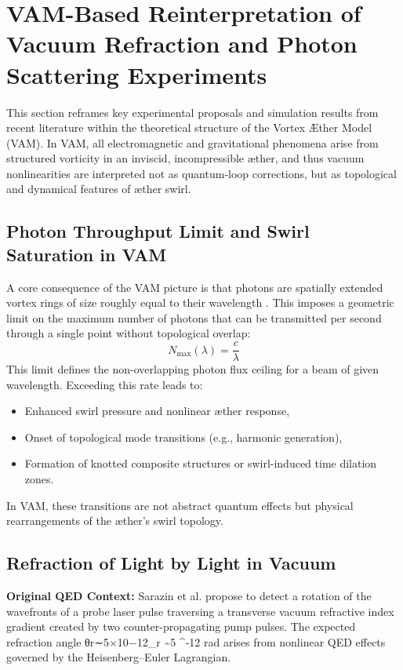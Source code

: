 
\section{VAM-Based Reinterpretation of Vacuum Refraction and Photon Scattering Experiments}


This section reframes key experimental proposals and simulation results from recent literature within the theoretical structure of the Vortex \AE{}ther Model (VAM). In VAM, all electromagnetic and gravitational phenomena arise from structured vorticity in an inviscid, incompressible \ae{}ther, and thus vacuum nonlinearities are interpreted not as quantum-loop corrections, but as topological and dynamical features of \ae{}ther swirl.


\subsection{Photon Throughput Limit and Swirl Saturation in VAM}

A core consequence of the VAM picture is that photons are spatially extended vortex rings of size roughly equal to their wavelength . This imposes a geometric limit on the maximum number of photons that can be transmitted per second through a single point without topological overlap:
\begin{equation}
N_\text{max}(\lambda) = \frac{c}{\lambda}
\end{equation}
This limit defines the non-overlapping photon flux ceiling for a beam of given wavelength. Exceeding this rate leads to:
\begin{itemize}
\item Enhanced swirl pressure and nonlinear \ae{}ther response,
\item Onset of topological mode transitions (e.g., harmonic generation),
\item Formation of knotted composite structures or swirl-induced time dilation zones.
\end{itemize}
In VAM, these transitions are not abstract quantum effects but physical rearrangements of the \ae{}ther's swirl topology.




\subsection{Refraction of Light by Light in Vacuum\cite{sarazin2016refraction}}


\textbf{Original QED Context:} Sarazin et al. propose to detect a rotation of the wavefronts of a probe laser pulse traversing a transverse vacuum refractive index gradient created by two counter-propagating pump pulses. The expected refraction angle θr∼5×10−12\theta_r \sim 5 ^{-12} rad arises from nonlinear QED effects governed by the Heisenberg--Euler Lagrangian.


